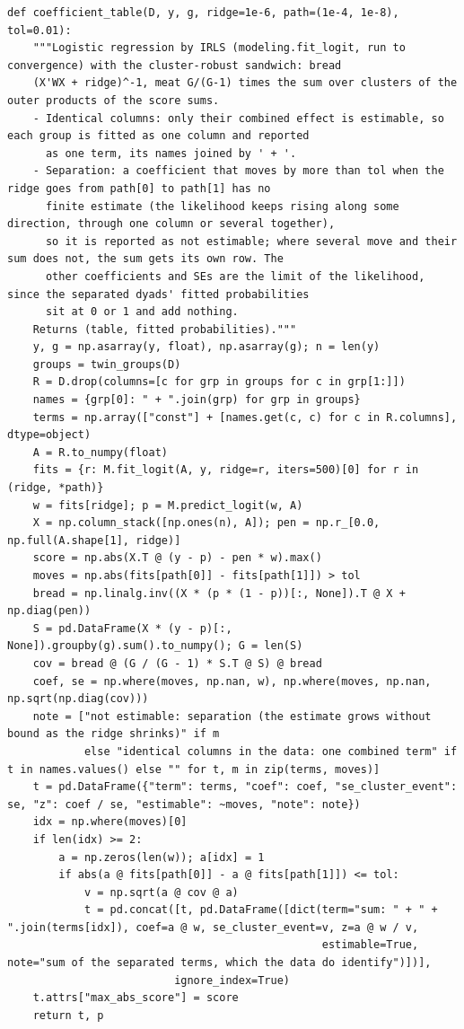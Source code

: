 \documentclass[11pt]{article}
\begin{document}
\begin{lstlisting}[caption={The coefficient table (scripts/part1\_models.py)}]
def coefficient_table(D, y, g, ridge=1e-6, path=(1e-4, 1e-8), tol=0.01):
    """Logistic regression by IRLS (modeling.fit_logit, run to convergence) with the cluster-robust sandwich: bread
    (X'WX + ridge)^-1, meat G/(G-1) times the sum over clusters of the outer products of the score sums.
    - Identical columns: only their combined effect is estimable, so each group is fitted as one column and reported
      as one term, its names joined by ' + '.
    - Separation: a coefficient that moves by more than tol when the ridge goes from path[0] to path[1] has no
      finite estimate (the likelihood keeps rising along some direction, through one column or several together),
      so it is reported as not estimable; where several move and their sum does not, the sum gets its own row. The
      other coefficients and SEs are the limit of the likelihood, since the separated dyads' fitted probabilities
      sit at 0 or 1 and add nothing.
    Returns (table, fitted probabilities)."""
    y, g = np.asarray(y, float), np.asarray(g); n = len(y)
    groups = twin_groups(D)
    R = D.drop(columns=[c for grp in groups for c in grp[1:]])
    names = {grp[0]: " + ".join(grp) for grp in groups}
    terms = np.array(["const"] + [names.get(c, c) for c in R.columns], dtype=object)
    A = R.to_numpy(float)
    fits = {r: M.fit_logit(A, y, ridge=r, iters=500)[0] for r in (ridge, *path)}
    w = fits[ridge]; p = M.predict_logit(w, A)
    X = np.column_stack([np.ones(n), A]); pen = np.r_[0.0, np.full(A.shape[1], ridge)]
    score = np.abs(X.T @ (y - p) - pen * w).max()
    moves = np.abs(fits[path[0]] - fits[path[1]]) > tol
    bread = np.linalg.inv((X * (p * (1 - p))[:, None]).T @ X + np.diag(pen))
    S = pd.DataFrame(X * (y - p)[:, None]).groupby(g).sum().to_numpy(); G = len(S)
    cov = bread @ (G / (G - 1) * S.T @ S) @ bread
    coef, se = np.where(moves, np.nan, w), np.where(moves, np.nan, np.sqrt(np.diag(cov)))
    note = ["not estimable: separation (the estimate grows without bound as the ridge shrinks)" if m
            else "identical columns in the data: one combined term" if t in names.values() else "" for t, m in zip(terms, moves)]
    t = pd.DataFrame({"term": terms, "coef": coef, "se_cluster_event": se, "z": coef / se, "estimable": ~moves, "note": note})
    idx = np.where(moves)[0]
    if len(idx) >= 2:
        a = np.zeros(len(w)); a[idx] = 1
        if abs(a @ fits[path[0]] - a @ fits[path[1]]) <= tol:
            v = np.sqrt(a @ cov @ a)
            t = pd.concat([t, pd.DataFrame([dict(term="sum: " + " + ".join(terms[idx]), coef=a @ w, se_cluster_event=v, z=a @ w / v,
                                                 estimable=True, note="sum of the separated terms, which the data do identify")])],
                          ignore_index=True)
    t.attrs["max_abs_score"] = score
    return t, p
\end{lstlisting}
\end{document}
